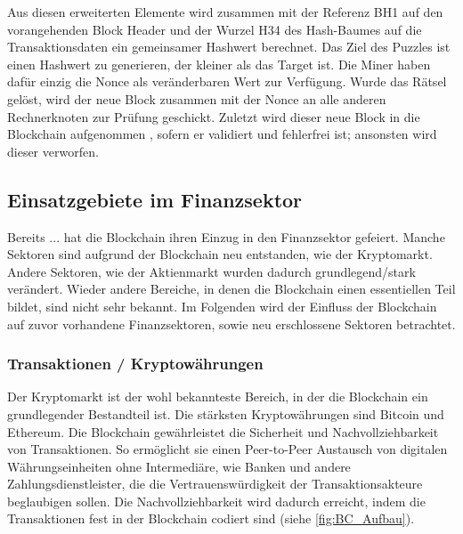 Aus diesen erweiterten Elemente wird zusammen mit der Referenz BH1 auf den vorangehenden 
Block Header und der Wurzel H34 des Hash-Baumes auf die Transaktionsdaten ein gemeinsamer 
Hashwert berechnet. 
Das Ziel des Puzzles ist einen Hashwert zu generieren, der kleiner als das Target ist. Die 
Miner haben dafür einzig die Nonce als veränderbaren Wert zur Verfügung. Wurde das Rätsel
gelöst, wird der neue Block zusammen mit der Nonce an alle anderen Rechnerknoten zur Prüfung
geschickt.
Zuletzt wird dieser neue Block in die Blockchain aufgenommen , sofern er validiert und 
fehlerfrei ist; ansonsten wird dieser verworfen.
\cite[p.~22ff]{fill2020blockchain}


\subsection{Einsatzgebiete im Finanzsektor}
Bereits ... hat die Blockchain ihren Einzug in den Finanzsektor gefeiert. Manche
Sektoren sind aufgrund der Blockchain neu entstanden, wie der Kryptomarkt. Andere Sektoren,
wie der Aktienmarkt wurden dadurch grundlegend/stark verändert. Wieder andere Bereiche, in denen die Blockchain
einen essentiellen Teil bildet, sind nicht sehr bekannt. Im Folgenden wird der Einfluss
der Blockchain auf zuvor vorhandene Finanzsektoren, sowie neu erschlossene Sektoren 
betrachtet.

\subsubsection{Transaktionen / Kryptowährungen}
Der Kryptomarkt ist der wohl bekannteste Bereich, in der die Blockchain ein 
grundlegender Bestandteil ist. 
Die stärksten Kryptowährungen sind Bitcoin und Ethereum. 
Die Blockchain gewährleistet die Sicherheit und Nachvollziehbarkeit von Transaktionen.
\cite[p.~168]{chowdhary2025smart}
So ermöglicht sie einen Peer-to-Peer Austausch von digitalen
Währungseinheiten ohne Intermediäre, wie Banken und andere Zahlungsdienstleister,
die die Vertrauenswürdigkeit der Transaktionsakteure beglaubigen sollen.
\cite[p.~32]{fill2020blockchain}
Die Nachvollziehbarkeit wird dadurch erreicht, indem die Transaktionen fest in der 
Blockchain codiert sind (siehe \autoref{fig:BC_Aufbau}).

